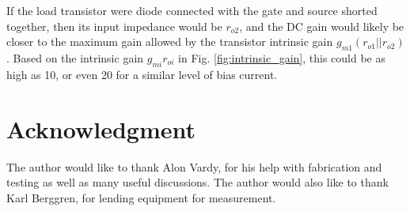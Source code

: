 \documentclass[conference]{IEEEtran}
\begin{document}
If the load transistor were diode connected with the gate and source shorted together, then its input impedance would be $r_{o2}$, and the DC gain would likely be closer to the maximum gain allowed by the transistor intrinsic gain $g_{m1}(r_{o1}||r_{o2})$.
Based on the intrinsic gain $g_{mi}r_{oi}$ in Fig. \ref{fig:intrinsic_gain}, this could be as high as 10, or even 20 for a similar level of bias current.

\section*{Acknowledgment}

The author would like to thank Alon Vardy, for his help with fabrication and testing as well as many useful discussions. The author would also like to thank Karl Berggren, for lending equipment for measurement.
\end{document}
